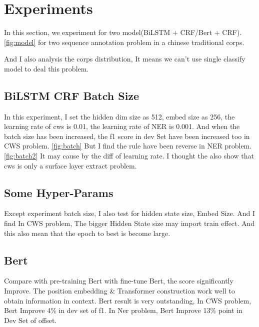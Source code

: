 \section{Experiments}
\label{sec:experiments}

In this section, we experiment for two model(BiLSTM + CRF/Bert + CRF).\ref{fig:model} for two sequence annotation problem in a chinese traditional corps.

And I also analysis the corps distribution, It means we can't use single classify model to deal this problem.

\subsection{BiLSTM CRF Batch Size}
\label{sec:BiLSTM CRF Batch Size}

In this experiment, I set the hidden dim size as 512, embed size as 256, the learning rate of cws is 0.01, the learning rate of NER is 0.001.
And when the batch size has been increased, the f1 score in dev Set have been increased too in CWS problem. \ref{fig:batch}
But I find the rule have been reverse in NER problem.\ref{fig:batch2} It may cause by the diff of learning rate. I thought the also show that cws is only a surface layer extract problem.

\subsection{Some Hyper-Params}
\label{sec:hyper params} 

Except experiment batch size, I also test for hidden state size, Embed Size.
And I find In CWS problem, The bigger Hidden State size may import train effect.
And this also mean that the epoch to best is become large.

\subsection{Bert}
\label{sec:bert}

Compare with pre-training Bert with fine-tune Bert, the score significantly Improve.
The position embedding \& Transformer construction work well to obtain information in context.
Bert result is very outstanding, In CWS problem, Bert Improve 4\% in dev set of f1. In Ner problem, Bert Improve 13\% point in Dev Set of offset.
 

